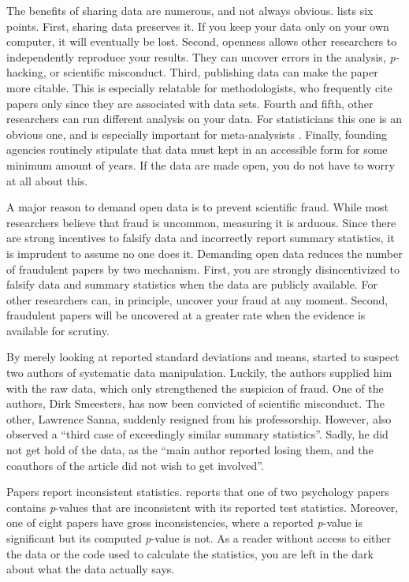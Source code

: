 The benefits of sharing data are numerous, and not always obvious. \textcite{Wicherts2012-cp} lists six points. First, sharing data preserves it. If you keep your data only on your own computer, it will eventually be lost. Second, openness allows other researchers to independently reproduce your results. They can uncover errors in the analysis, \emph{p-}hacking, or scientific misconduct. Third, publishing data can make the paper more citable. This is especially relatable for methodologists, who frequently cite papers only since they are associated with data sets. Fourth and fifth, other researchers can run different analysis on your data. For statisticians this one is an obvious one, and is especially important for meta-analysists \parencite{Cooper2009-ge}. Finally, founding agencies routinely stipulate that data must kept in an accessible form for some minimum amount of years. If the data are made open, you do not have to worry at all about this.  

A major reason to demand open data is to prevent scientific fraud. While most researchers believe that fraud is uncommon, measuring it is arduous. Since there are strong incentives to falsify data and incorrectly report summary statistics, it is imprudent to assume no one does it. Demanding open data reduces the number of fraudulent papers by two mechanism. First, you are strongly disincentivized to falsify data and summary statistics when the data are publicly available. For other researchers can, in principle, uncover your fraud at any moment. Second, fraudulent papers will be uncovered at a greater rate when the evidence is available for scrutiny. 

By merely looking at reported standard deviations and means, \textcite{Simonsohn2013-ul} started to suspect two authors of systematic data manipulation. Luckily, the authors supplied him with the raw data, which only strengthened the suspicion of fraud. One of the authors, Dirk Smeesters, has now been convicted of scientific misconduct. The other, Lawrence Sanna, suddenly resigned from his professorship. However, \textcite{Simonsohn2013-ul}
also observed a ``third case of exceedingly similar summary statistics''. Sadly, he did not get hold of the data, as the ``main author reported losing them, and the coauthors of the article did not wish to get involved''.

Papers report inconsistent statistics. \textcite{Nuijten2016-eu} reports that one of two psychology papers contains \emph{p}-values that are inconsistent with its reported test statistics. Moreover, one of eight papers have gross inconsistencies, where a reported \emph{p}-value is significant but its computed \emph{p}-value is not. As a reader without access to either the data or the code used to calculate the statistics, you are left in the dark about what the data actually says.

